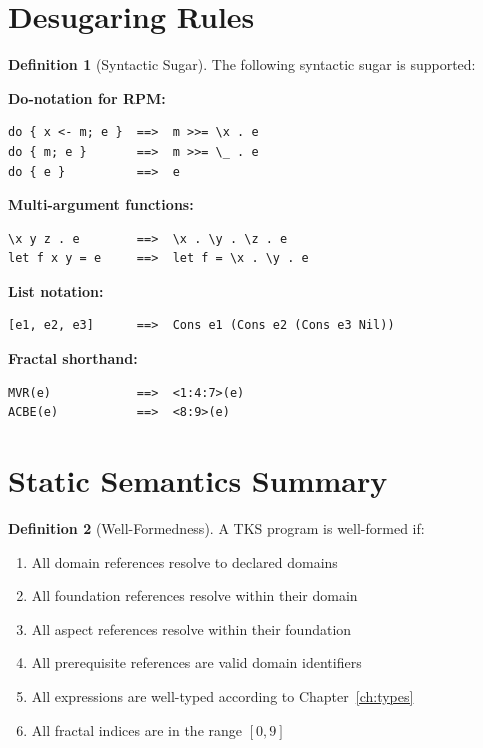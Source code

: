 \documentclass[11pt,twoside,openright]{book}
\theoremstyle{definition}
\newtheorem{definition}{Definition}[chapter]
\theoremstyle{plain}
\theoremstyle{remark}
\begin{document}
\section{Desugaring Rules}

\begin{definition}[Syntactic Sugar]
\label{def:desugar}
The following syntactic sugar is supported:

\textbf{Do-notation for RPM:}
\begin{verbatim}
do { x <- m; e }  ==>  m >>= \x . e
do { m; e }       ==>  m >>= \_ . e
do { e }          ==>  e
\end{verbatim}

\textbf{Multi-argument functions:}
\begin{verbatim}
\x y z . e        ==>  \x . \y . \z . e
let f x y = e     ==>  let f = \x . \y . e
\end{verbatim}

\textbf{List notation:}
\begin{verbatim}
[e1, e2, e3]      ==>  Cons e1 (Cons e2 (Cons e3 Nil))
\end{verbatim}

\textbf{Fractal shorthand:}
\begin{verbatim}
MVR(e)            ==>  <1:4:7>(e)
ACBE(e)           ==>  <8:9>(e)
\end{verbatim}
\end{definition}

\section{Static Semantics Summary}

\begin{definition}[Well-Formedness]
\label{def:well-formed}
A TKS program is well-formed if:
\begin{enumerate}
\item All domain references resolve to declared domains
\item All foundation references resolve within their domain
\item All aspect references resolve within their foundation
\item All prerequisite references are valid domain identifiers
\item All expressions are well-typed according to Chapter~\ref{ch:types}
\item All fractal indices are in the range $[0, 9]$
\end{enumerate}
\end{definition}
\end{document}
